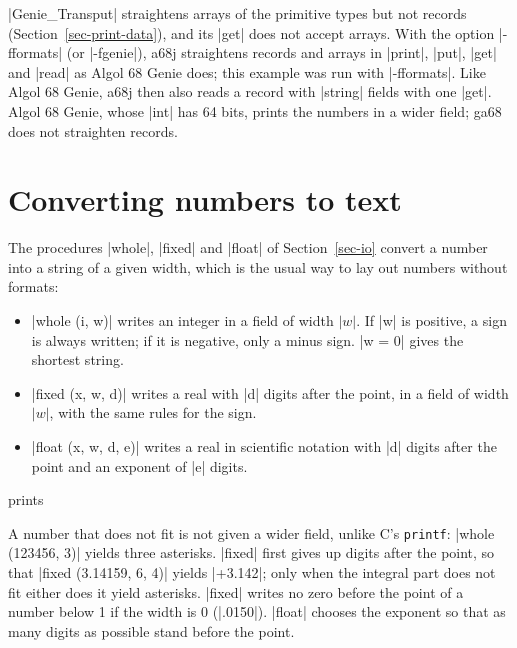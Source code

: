\begin{implnote}
\code|Genie_Transput| straightens arrays of the primitive types but not
records (Section~\ref{sec-print-data}), and its \code|get| does not
accept arrays. With the option \code|-fformats| (or \code|-fgenie|),
a68j straightens records and arrays in \code|print|, \code|put|,
\code|get| and \code|read| as Algol 68 Genie does; this example was run
with \code|-fformats|. Like Algol 68 Genie, a68j then also reads a
record with \code|string| fields with one \code|get|. Algol 68 Genie,
whose \code|int| has 64 bits, prints the numbers in a wider field; ga68
does not straighten records.
\end{implnote}

\section{Converting numbers to text}\label{sec-conversions}

The procedures \code|whole|, \code|fixed| and \code|float| of
Section~\ref{sec-io} convert a number into a string of a given width,
which is the usual way to lay out numbers without formats:
\begin{itemize}
\item \code|whole (i, w)| writes an integer in a field of width
  $|w|$. If \code|w| is positive, a sign is always written; if it is
  negative, only a minus sign. \code|w = 0| gives the shortest string.
\item \code|fixed (x, w, d)| writes a real with \code|d| digits after
  the point, in a field of width $|w|$, with the same rules for the sign.
\item \code|float (x, w, d, e)| writes a real in scientific notation with
  \code|d| digits after the point and an exponent of \code|e| digits.
\end{itemize}


\noindent prints

A number that does not fit is not given a wider field, unlike C's
\texttt{printf}: \code|whole (123456, 3)| yields three asterisks.
\code|fixed| first gives up digits after the point, so that
\code|fixed (3.14159, 6, 4)| yields \code|+3.142|; only when the integral
part does not fit either does it yield asterisks. \code|fixed| writes no
zero before the point of a number below 1 if the width is 0
(\code|.0150|). \code|float| chooses the exponent so that as many digits
as possible stand before the point.

